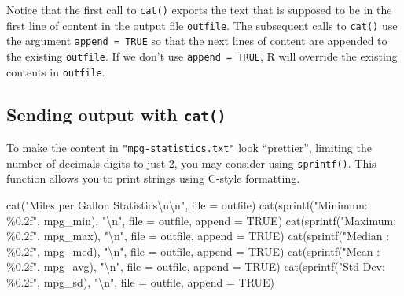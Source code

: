 \documentclass[
]{book}
\newenvironment{Shaded}{\begin{snugshade}}{\end{snugshade}}
\newcommand{\AttributeTok}[1]{\textcolor[rgb]{0.77,0.63,0.00}{#1}}
\newcommand{\ConstantTok}[1]{\textcolor[rgb]{0.00,0.00,0.00}{#1}}
\newcommand{\FunctionTok}[1]{\textcolor[rgb]{0.00,0.00,0.00}{#1}}
\newcommand{\NormalTok}[1]{#1}
\newcommand{\SpecialCharTok}[1]{\textcolor[rgb]{0.00,0.00,0.00}{#1}}
\newcommand{\StringTok}[1]{\textcolor[rgb]{0.31,0.60,0.02}{#1}}
\begin{document}
Notice that the first call to \texttt{cat()} exports the text that is supposed to be
in the first line of content in the output file \texttt{outfile}. The subsequent calls
to \texttt{cat()} use the argument \texttt{append\ =\ TRUE} so that the next lines of content
are appended to the existing \texttt{outfile}. If we don't use \texttt{append\ =\ TRUE}, R will
override the existing contents in \texttt{outfile}.

\hypertarget{sending-output-with-cat-1}{%
\subsection{\texorpdfstring{Sending output with \texttt{cat()}}{Sending output with cat()}}\label{sending-output-with-cat-1}}

To make the content in \texttt{"mpg-statistics.txt"} look ``prettier'', limiting the
number of decimals digits to just 2, you may consider using \texttt{sprintf()}. This
function allows you to print strings using C-style formatting.

\begin{Shaded}
\begin{Highlighting}[]
\FunctionTok{cat}\NormalTok{(}\StringTok{"Miles per Gallon Statistics}\SpecialCharTok{\textbackslash{}n\textbackslash{}n}\StringTok{"}\NormalTok{, }\AttributeTok{file =}\NormalTok{ outfile)}
\FunctionTok{cat}\NormalTok{(}\FunctionTok{sprintf}\NormalTok{(}\StringTok{"Minimum: \%0.2f"}\NormalTok{, mpg\_min), }\StringTok{"}\SpecialCharTok{\textbackslash{}n}\StringTok{"}\NormalTok{, }\AttributeTok{file =}\NormalTok{ outfile, }\AttributeTok{append =} \ConstantTok{TRUE}\NormalTok{)}
\FunctionTok{cat}\NormalTok{(}\FunctionTok{sprintf}\NormalTok{(}\StringTok{"Maximum: \%0.2f"}\NormalTok{, mpg\_max), }\StringTok{"}\SpecialCharTok{\textbackslash{}n}\StringTok{"}\NormalTok{, }\AttributeTok{file =}\NormalTok{ outfile, }\AttributeTok{append =} \ConstantTok{TRUE}\NormalTok{)}
\FunctionTok{cat}\NormalTok{(}\FunctionTok{sprintf}\NormalTok{(}\StringTok{"Median : \%0.2f"}\NormalTok{, mpg\_med), }\StringTok{"}\SpecialCharTok{\textbackslash{}n}\StringTok{"}\NormalTok{, }\AttributeTok{file =}\NormalTok{ outfile, }\AttributeTok{append =} \ConstantTok{TRUE}\NormalTok{)}
\FunctionTok{cat}\NormalTok{(}\FunctionTok{sprintf}\NormalTok{(}\StringTok{"Mean   : \%0.2f"}\NormalTok{, mpg\_avg), }\StringTok{"}\SpecialCharTok{\textbackslash{}n}\StringTok{"}\NormalTok{, }\AttributeTok{file =}\NormalTok{ outfile, }\AttributeTok{append =} \ConstantTok{TRUE}\NormalTok{)}
\FunctionTok{cat}\NormalTok{(}\FunctionTok{sprintf}\NormalTok{(}\StringTok{"Std Dev: \%0.2f"}\NormalTok{, mpg\_sd), }\StringTok{"}\SpecialCharTok{\textbackslash{}n}\StringTok{"}\NormalTok{, }\AttributeTok{file =}\NormalTok{ outfile, }\AttributeTok{append =} \ConstantTok{TRUE}\NormalTok{)}
\end{Highlighting}
\end{Shaded}
\end{document}
